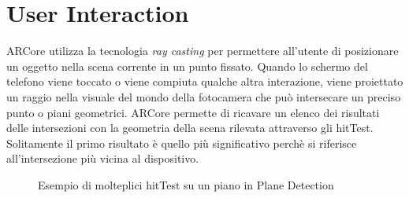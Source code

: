 \documentclass[crop=false, class=book]{standalone}
\begin{document}
	\chapter{User Interaction}
	ARCore utilizza la tecnologia \textit{ray casting} per permettere all'utente di posizionare un oggetto nella scena corrente 	in un punto fissato. Quando lo schermo del telefono viene toccato o viene compiuta qualche altra interazione, 					viene proiettato un raggio nella visuale del mondo della fotocamera che può intersecare un preciso punto o piani 				geometrici. ARCore permette di ricavare un elenco dei risultati delle intersezioni con la geometria della scena rilevata 		attraverso gli hitTest. Solitamente il primo risultato è quello più significativo perchè si riferisce all'intersezione più 		vicina al dispositivo.
	
	\begin{figure}
			\centering
			\caption{Esempio di molteplici hitTest su un piano in Plane Detection}
			\label{fig:pet_img}
	\end{figure}
	
\end{document}
